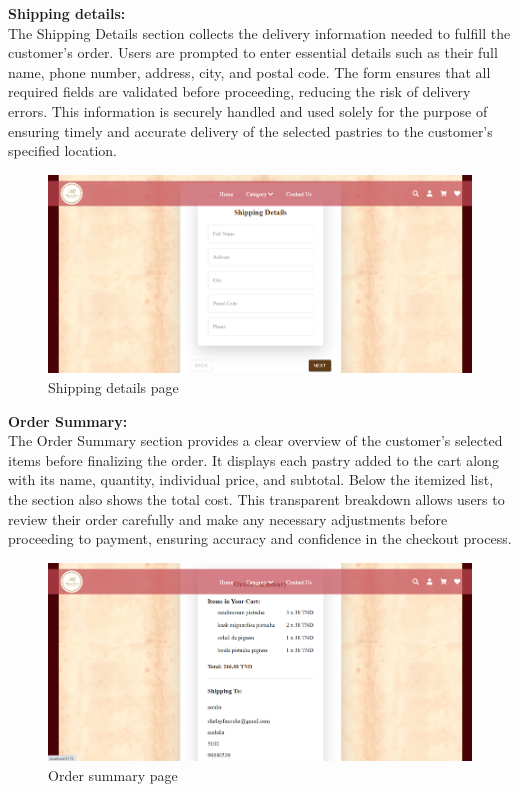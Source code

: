 \textbf{Shipping details:}\\

The Shipping Details section collects the delivery information needed to fulfill the customer’s order. Users are prompted to enter essential details such as their full name, phone number, address, city, and postal code. The form ensures that all required fields are validated
before proceeding, reducing the risk of delivery errors. This information is securely handled and used solely for the purpose of ensuring timely and accurate delivery of the selected pastries to the customer's specified location.

\begin{figure}[!h]
\begin{center}
\includegraphics{images/Shipping details page.png}
\end{center}
\caption{Shipping details page}
\end{figure}

\newpage
\textbf{Order Summary:}\\

The Order Summary section provides a clear overview of the customer's selected items before finalizing the order. It displays each pastry added to the cart along with its name, quantity, individual price, and subtotal. Below the itemized list, the section also shows the total cost. This transparent breakdown allows users to review their order carefully and make any necessary adjustments before proceeding to payment, ensuring accuracy and confidence in the checkout process.

\begin{figure}[!h]
\begin{center}
\includegraphics{images/Order Summary.png}
\end{center}
\caption{Order summary page}
\end{figure}


